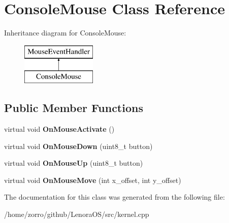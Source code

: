 \hypertarget{classConsoleMouse}{}\section{Console\+Mouse Class Reference}
\label{classConsoleMouse}
Inheritance diagram for Console\+Mouse\+:\begin{figure}[H]
\begin{center}
\leavevmode
\includegraphics[height=2.000000cm]{classConsoleMouse}
\end{center}
\end{figure}
\subsection*{Public Member Functions}
\begin{DoxyCompactItemize}
\item 
\mbox{\label{classConsoleMouse_ad3b3c7cf5eed05fb369ae4f0f018eb6c}} 
virtual void {\bfseries On\+Mouse\+Activate} ()
\item 
\mbox{\label{classConsoleMouse_a8d48f2e512994c819f9ad0a317ac213e}} 
virtual void {\bfseries On\+Mouse\+Down} (uint8\+\_\+t button)
\item 
\mbox{\label{classConsoleMouse_a33a6f1e0c759b0964536d6204196b225}} 
virtual void {\bfseries On\+Mouse\+Up} (uint8\+\_\+t button)
\item 
\mbox{\label{classConsoleMouse_a36634acf764621f33ac03d6615109278}} 
virtual void {\bfseries On\+Mouse\+Move} (int x\+\_\+offset, int y\+\_\+offset)
\end{DoxyCompactItemize}


The documentation for this class was generated from the following file\+:\begin{DoxyCompactItemize}
\item 
/home/zorro/github/\+Lenora\+O\+S/src/kernel.\+cpp\end{DoxyCompactItemize}
